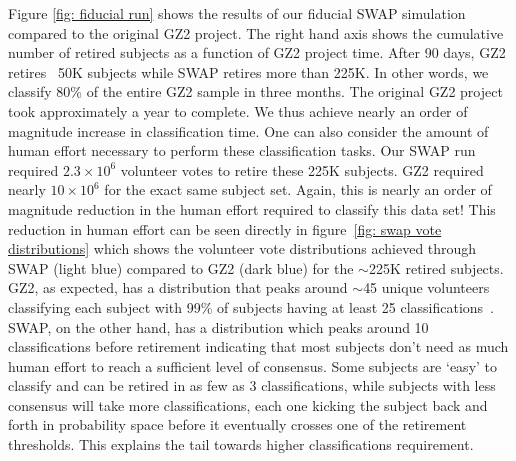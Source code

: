 \documentclass[twocolumn]{aastex6}
\begin{document}
Figure \ref{fig: fiducial run} shows the results of our fiducial SWAP simulation
compared to the original GZ2 project. The right hand  axis shows the cumulative
number of retired subjects as a function of GZ2 project time. After 90 days, GZ2 
retires ~50K subjects while SWAP retires more than 225K. In other words, we classify 80\% of
the entire GZ2 sample in three months. The original GZ2 project took approximately
a year to complete. We thus achieve nearly an order of magnitude increase in
classification time. One can also consider the amount of human effort necessary to 
perform these classification tasks. Our SWAP run required $2.3 \times 10^6$ volunteer
votes to retire these 225K subjects. GZ2 required nearly $10 \times 10^6$ for the 
exact same subject set. Again, this is nearly an order of magnitude reduction in 
the human effort required to classify this data set! This reduction in human effort 
can be seen directly in figure~\ref{fig: swap vote distributions} which shows the volunteer 
vote distributions achieved through SWAP (light blue) compared to GZ2 (dark blue)
for the $\sim$225K retired subjects. GZ2, as expected, has a distribution that peaks 
around $\sim$45 unique volunteers classifying each subject with 99\% of subjects 
having at least 25 classifications~\citep{Willett2013}. 
SWAP, on the other hand, has a distribution which peaks around 10 classifications
before retirement indicating that most subjects don't need as much human effort
to reach a sufficient level of consensus. Some subjects are `easy' to classify and can be 
retired in as few as 3 classifications, while subjects with less consensus will 
take more classifications, each one kicking the subject back and forth in probability space
before it eventually crosses one of the retirement thresholds. 
This explains the tail towards higher classifications requirement.
\end{document}

